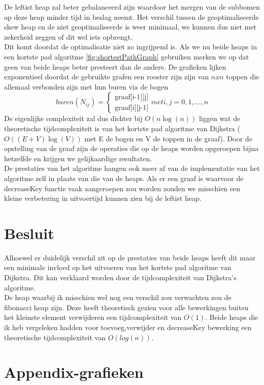 \documentclass[10pt,a4paper,twoside]{article}
\begin{document}
De leftist heap zal beter gebalanceerd zijn waardoor het mergen van de subbomen op deze heap minder tijd in beslag neemt. Het verschil tussen de geoptimaliseerde skew heap en de niet geoptimaliseerde is weer minimaal, we kunnen dus niet met zekerheid zeggen of dit wel iets opbrengt.\\
Dit komt doordat de optimalisatie niet zo ingrijpend is.
Als we nu beide heaps in een kortste pad algoritme \ref{fig:shortestPathGraph} gebruiken merken we op dat geen van beide heaps beter presteert dan de andere. De grafieken lijken exponentieel doordat de gebruikte grafen een rooster zijn zijn van $nxn$ toppen die allemaal verbonden zijn met hun buren via de bogen
$$buren(N_{ij})=\begin{cases}
       \text{graaf[i-1][j]}\\
       \text{graaf[i][j-1]}
     \end{cases} met i,j=0,1,...,n$$
De eigenlijke complexiteit zal dus dichter bij $O(n\log(n))$ liggen wat de theoretische tijdcomplexiteit is van het kortste pad algoritme van Dijkstra ($O((E+V)\log(V))$ met E de bogen en V de toppen in de graaf).
Door de opstelling van de graaf zijn de operaties die op de heaps worden opgeroepen bijna hetzelfde en krijgen we gelijkaardige resultaten.\\
De prestaties van het algoritme hangen ook meer af van de implementatie van het algoritme zelf in plaats van die van de heaps. Als er een graaf is waarvoor de {\selectfont decreaseKey} functie vaak aangeroepen zou worden zouden we misschien een kleine verbetering in uitvoertijd kunnen zien bij de leftist heap.


\section{Besluit}
Alhoewel er duidelijk verschil zit op de prestaties van beide heaps heeft dit maar een minimale invloed op het uitvoeren van het kortste pad algoritme van Dijkstra. Dit kan verklaard worden door de tijdcomplexiteit van Dijkstra's algoritme.\\
De heap waarbij ik misschien wel nog een verschil zou verwachten zou de fibonacci heap zijn. Deze heeft theoretisch gezien voor alle bewerkingen buiten het kleinste element verwijderen een tijdcomplexiteit van $O(1)$. Beide heaps die ik heb vergeleken hadden voor toevoeg,verwijder en decreaseKey bewerking een theoretische tijdcomplexiteit van $O(log(n))$.
\newpage

\section{Appendix-grafieken}
\end{document}
